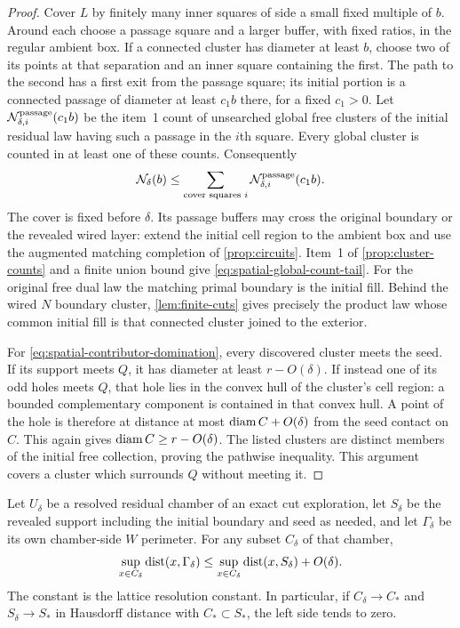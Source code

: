 \begin{proof}
Cover $L$ by finitely many inner squares of side a small fixed
multiple of $b$. Around each choose a passage square and a larger
buffer, with fixed ratios, in the regular ambient box. If a
connected cluster has diameter at least $b$, choose two of its
points at that separation and an inner square containing the first.
The path to the second has a first exit from the passage square;
its initial portion is a connected passage of diameter at least
$c_1b$ there, for a fixed $c_1>0$. Let
$\mathcal N_{\delta,i}^{\rm passage}(c_1b)$ be the item~1 count
of unsearched global free clusters of the initial residual law
having such a passage in the $i$th square.
Every global cluster is counted in at least one of these counts.
Consequently
\[
        \mathcal N_\delta(b)
            \le \sum_{\text{cover squares }i}
                 \mathcal N_{\delta,i}^{\rm passage}(c_1b).
\]
The cover is fixed before $\delta$. Its passage buffers may cross
the original boundary or the revealed wired layer: extend the
initial cell region to the ambient box and use the augmented
matching completion of \cref{prop:circuits}. Item~1 of
\cref{prop:cluster-counts} and a finite union bound give
\eqref{eq:spatial-global-count-tail}. For the original free dual
law the matching primal boundary is the initial fill. Behind the
wired $N$ boundary cluster, \cref{lem:finite-cuts} gives precisely
the product law whose common initial fill is that connected cluster
joined to the exterior.

For \eqref{eq:spatial-contributor-domination}, every discovered
cluster meets the seed. If its support meets $Q$, it has diameter
at least $r-O(\delta)$. If instead one of its odd holes meets $Q$,
that hole lies in the convex hull of the cluster's cell region:
a bounded complementary component is contained in that convex
hull. A point of the hole is therefore at distance at most
$\operatorname{diam} C+O(\delta)$ from the seed contact on $C$. This again gives
$\operatorname{diam} C\ge r-O(\delta)$. The listed clusters are distinct members
of the initial free collection, proving the pathwise inequality.
This argument covers a cluster which surrounds $Q$ without meeting it.
\end{proof}

\begin{lemma}\label{lem:chamber-rim-distance}
Let $U_\delta$ be a resolved residual chamber of an exact cut
exploration, let $S_\delta$ be the revealed support including the
initial boundary and seed as needed, and let $\Gamma_\delta$ be its
own chamber-side
$W$ perimeter. For any subset $C_\delta$ of that chamber,
\begin{equation}\label{eq:spatial-own-rim-distance}
 \sup_{x\in C_\delta}\operatorname{dist}(x,\Gamma_\delta)
       \le \sup_{x\in C_\delta}\operatorname{dist}(x,S_\delta)+O(\delta).
\end{equation}
The constant is the lattice resolution constant. In particular, if
$C_\delta\to C_*$ and $S_\delta\to S_*$ in Hausdorff distance with
$C_*\subset S_*$, the left side tends to zero.
\end{lemma}

